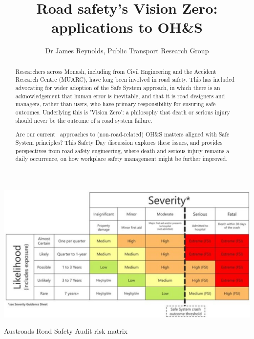 \documentclass{tufte-handout}
\title{Road safety's Vision Zero: applications to OH\&S}
\author{Dr James Reynolds, Public Transport Research Group}
\begin{document}
\maketitle%

\begin{abstract}
\noindent
Researchers across Monash, including from Civil Engineering and the Accident Research Centre (MUARC), have long been involved in road safety. This has included advocating for wider adoption of the Safe System approach\cite{TAC:2016aa}, in which there is an acknowledgement that human error is inevitable, and that it is road designers and managers, rather than users, who have primary responsibility for ensuring safe outcomes. Underlying this is 'Vision Zero': a philosophy that death or serious injury should never be the outcome of a road system failure\cite{Lydon:2017aa}.

Are our current  approaches to (non-road-related) OH\&S matters aligned with Safe System principles? This Safety Day discussion explores these issues, and provides perspectives from road safety engineering, where death and serious injury remains a daily occurrence, on how workplace safety management might be further improved.\end{abstract}



\begin{marginfigure}
\includegraphics{Austroads_risk_matrix}
\caption{Austroads Road Safety Audit risk matrix}
\label{fig:Austroads_risk_matrix}
\end{marginfigure}
\end{document}
